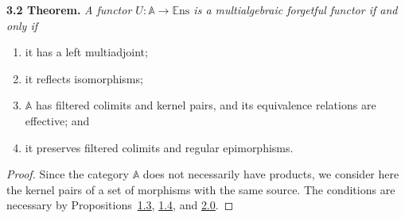\documentclass{article}
\newenvironment{itenv}[1]
  {\phantomsection\par\medskip\noindent\textbf{#1.}\itshape}
  {\par\medskip}
\newcommand{\bb}[1]{{\mathbb{#1}}}
\newcommand{\Set}{\mathbb{E}\mathrm{ns}}
\begin{document}
\begin{itenv}{3.2 Theorem}
\label{3.2}
  A functor $U\colon\bb{A}\to\Set$ is a multialgebraic forgetful functor if and only if
  \begin{enumerate}[1)]
    \item it has a left multiadjoint;
    \item it reflects isomorphisms;
    \item $\bb{A}$ has filtered colimits and kernel pairs, and its equivalence relations are effective; and
    \item it preserves filtered colimits and regular epimorphisms.
  \end{enumerate}
\end{itenv}

\begin{proof}
  Since the category $\bb{A}$ does not necessarily have products, we consider here the kernel pairs of a set of morphisms with the same source.
  The conditions are necessary by Propositions~\hyperref[1.3]{1.3}, \hyperref[1.4]{1.4}, and \hyperref[2.0]{2.0}.


\end{proof}
\end{document}
